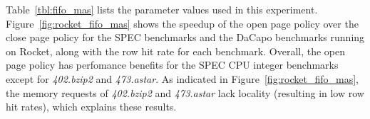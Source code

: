 \begin{table}[t]
\centering
{}
\caption{FIFO MAS Parameters}
\label{tbl:fifo_mas}
\end{table}

Table~\ref{tbl:fifo_mas} lists the parameter values used in this experiment.
Figure~\ref{fig:rocket_fifo_mas} shows the speedup of the open page policy over
the close page policy for the SPEC benchmarks and the DaCapo benchmarks running
on Rocket, along with the row hit rate for each benchmark. Overall, the open
page policy has perfomance benefits for the SPEC CPU integer benchmarks except
for \textit{402.bzip2} and \textit{473.astar}. As indicated in
Figure~\ref{fig:rocket_fifo_mas}, the memory requests of \textit{402.bzip2} and
\textit{473.astar} lack locality (resulting in low row hit rates), which
explains these results.
